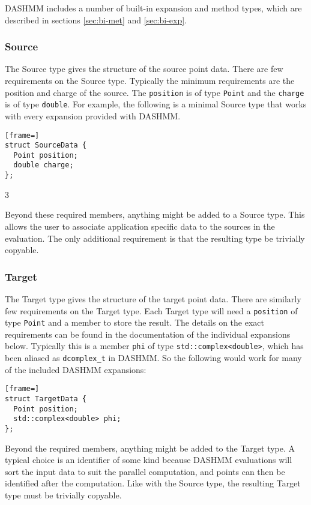DASHMM includes a number of built-in expansion and method types, which are
described in sections \ref{sec:bi-met} and \ref{sec:bi-exp}.


\subsubsection{Source}
The Source type gives the structure of the source point data. There
are few requirements on the Source type. Typically the minimum
requirements are the position and charge of the source. The \texttt{position}
is of type \texttt{Point} and the \texttt{charge} is of type
\texttt{double}. For example, the following is a minimal Source type that
works with every expansion provided with DASHMM.

\begin{lstlisting}[frame=]
struct SourceData {
  Point position;
  double charge;
};
\end{lstlisting}3

\noindent Beyond these required members, anything might be added to a Source
type. This allows the user to associate application specific data to
the sources in the evaluation. The only additional requirement is that
the resulting type be trivially copyable.

\subsubsection{Target}
The Target type gives the structure of the target point data. There
are similarly few requirements on the Target type. Each Target type
will need a \texttt{position} of type \texttt{Point} and a member to store
the result. The details on the exact requirements can be found in the
documentation of the individual expansions below. Typically this is a
member \texttt{phi} of type \texttt{std::complex<double>}, which has been
aliased as \texttt{dcomplex\_t} in DASHMM. So the following would work
for many of the included DASHMM expansions:

\begin{lstlisting}[frame=]
struct TargetData {
  Point position;
  std::complex<double> phi;
};
\end{lstlisting}

\noindent Beyond the required members, anything might be added to the Target
type. A typical choice is an identifier of some kind because DASHMM
evaluations will sort the input data to suit the parallel computation,
and points can then be identified after the computation. Like with the
Source type, the resulting Target type must be trivially copyable.

